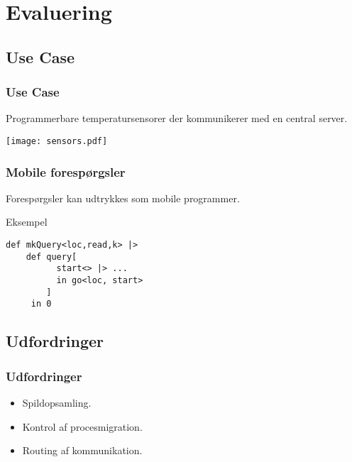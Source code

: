 \documentclass{beamer}
\begin{document}
\section{Evaluering}

\subsection{Use Case}
\begin{frame}
\frametitle{Use Case}
Programmerbare temperatursensorer der kommunikerer med en central server.
\begin{center}
\texttt{[image: sensors.pdf]}
\end{center}
\end{frame}

\begin{frame}[fragile]
\frametitle{Mobile forespørgsler}
Forespørgsler kan udtrykkes som mobile programmer.
\begin{block}{Eksempel}
\begin{lstlisting}
def mkQuery<loc,read,k> |>
    def query[
          start<> |> ...
          in go<loc, start>
        ]
     in 0
\end{lstlisting}
\end{block}
\end{frame}


\subsection{Udfordringer}
\begin{frame}
\frametitle{Udfordringer}
\begin{itemize}
 \item Spildopsamling.
 \item Kontrol af procesmigration.
 \item Routing af kommunikation.
\end{itemize}
\end{frame}
\end{document}
